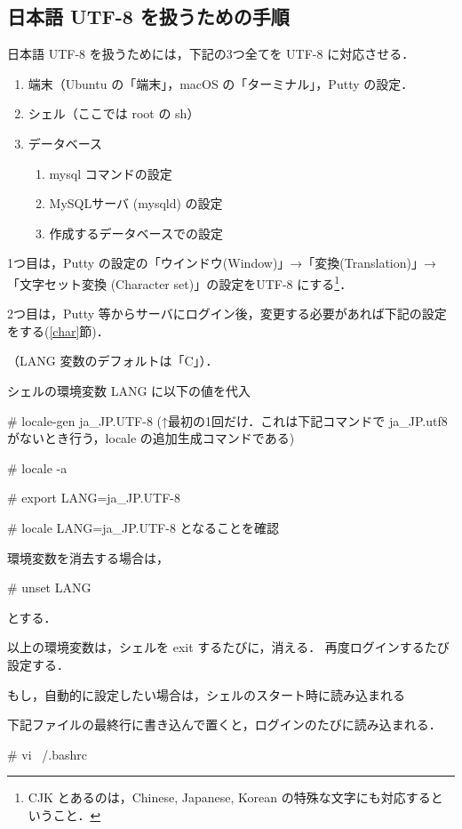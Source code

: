 \subsection{日本語 UTF-8 を扱うための手順}
\label{sec:japanese-locale}

日本語 UTF-8 を扱うためには，下記の3つ全てを UTF-8 に対応させる．
\begin{enumerate}
 \item 端末（Ubuntu の「端末」，macOS の「ターミナル」，Putty の設定．
 \item シェル（ここでは root の sh）
 \item データベース
       \begin{enumerate}
	\item mysql コマンドの設定
	\item MySQLサーバ (mysqld) の設定
	\item 作成するデータベースでの設定
       \end{enumerate}
\end{enumerate}

1つ目は，Putty の設定の「ウインドウ(Window)」→「変換(Translation)」→
「文字セット変換 (Character set)」の設定をUTF-8 にする\footnote{CJK とあるのは，Chinese,
Japanese, Korean の特殊な文字にも対応するということ．}．

2つ目は，Putty 等からサーバにログイン後，変更する必要があれば下記の設定をする(\ref{char}節)．

（LANG 変数のデフォルトは「C」）．

\begin{cli}
シェルの環境変数 LANG に以下の値を代入

# locale-gen ja_JP.UTF-8
(↑最初の1回だけ．これは下記コマンドで ja_JP.utf8 がないとき行う，locale の追加生成コマンドである)

# locale -a

# export LANG=ja_JP.UTF-8

# locale
LANG=ja_JP.UTF-8
となることを確認

環境変数を消去する場合は，

# unset LANG

とする．

以上の環境変数は，シェルを exit するたびに，消える．
再度ログインするたび設定する．

もし，自動的に設定したい場合は，シェルのスタート時に読み込まれる

下記ファイルの最終行に書き込んで置くと，ログインのたびに読み込まれる．

# vi ~/.bashrc

\end{cli}

